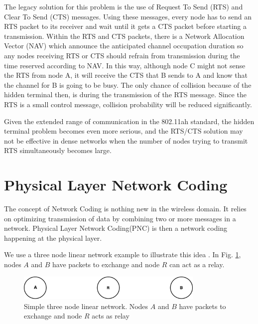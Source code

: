 The legacy solution for this problem is the use of Request To Send (RTS) and Clear To Send (CTS) messages. Using these messages, every node has to send an RTS packet to its receiver and wait until it gets a CTS packet before starting a transmission. Within the RTS and CTS packets, there is a Network Allocation Vector (NAV) which announce the anticipated channel occupation duration so any nodes receiving RTS or CTS should refrain from transmission during the time reserved according to NAV. In this way, although node C might not sense the RTS from node A, it will receive the CTS that B sends to A and know that the channel for B is going to be busy. The only chance of collision because of the hidden terminal then, is during the transmission of the RTS message. Since the RTS is a small control message, collision probability will be reduced significantly. 

Given the extended range of communication in the 802.11ah standard, the hidden terminal problem becomes even more serious, and the RTS/CTS solution may not be effective in dense networks when the number of nodes trying to transmit RTS simultaneously becomes large.



\section{Physical Layer Network Coding}

The concept of Network Coding is nothing new in the wireless domain. It relies on optimizing transmission of data by combining two or more messages in a network. Physical Layer Network Coding(PNC) is then a network coding happening at the physical layer.

We use a three node linear network example to illustrate this idea \cite{zhang2006hot}. In Fig. \ref{fig:justThreeNodes}, nodes $A$ and $B$ have packets to exchange and node $R$ can act as a relay.


\begin{figure} [th]
    \centering
    \includegraphics[width=0.8\textwidth]{figures/justThreeNodes.pdf}
    \caption{Simple three node linear network. Nodes $A$ and $B$ have packets to exchange and node $R$ acts as relay} \label{fig:justThreeNodes}
\end{figure}

